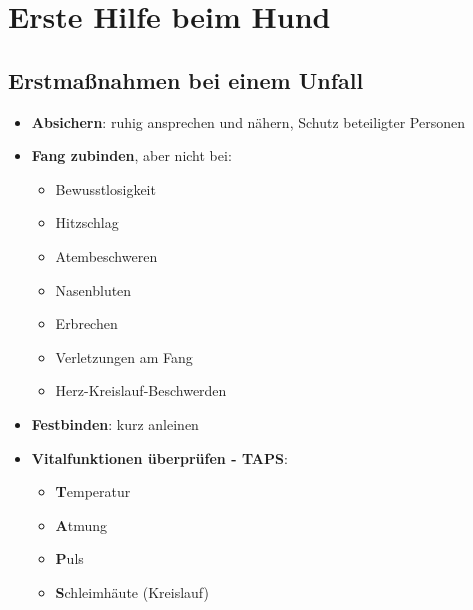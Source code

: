 \chapter{Erste Hilfe beim Hund}


\section{Erstmaßnahmen bei einem Unfall}
    \begin{itemize}
        \item \textbf{Absichern}: ruhig ansprechen und nähern, Schutz beteiligter Personen
        \item \textbf{Fang zubinden}, aber nicht bei:
        \begin{itemize}
             \item Bewusstlosigkeit
             \item Hitzschlag
             \item Atembeschweren
             \item Nasenbluten
             \item Erbrechen
             \item Verletzungen am Fang
             \item Herz-Kreislauf-Beschwerden
         \end{itemize}
        \item \textbf{Festbinden}: kurz anleinen
        \item \textbf{Vitalfunktionen überprüfen - TAPS}:
        \begin{itemize}
            \item \textbf{T}emperatur
            \item \textbf{A}tmung
            \item \textbf{P}uls
            \item \textbf{S}chleimhäute (Kreislauf)
        \end{itemize}
    \end{itemize}

